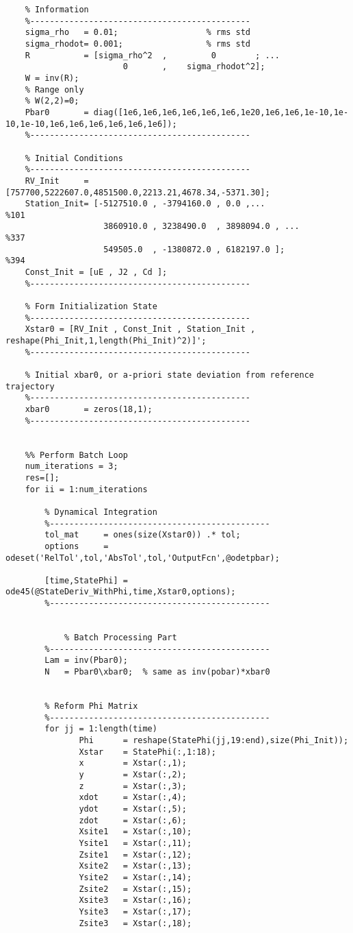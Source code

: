 \documentclass[12pt,a4paper,oneside]{article}
\numberwithin{equation}{section}   		%
\begin{document}
\begin{appendices}
\begin{lstlisting}
	% Information
	%---------------------------------------------
	sigma_rho   = 0.01;                  % rms std
	sigma_rhodot= 0.001;                 % rms std
	R           = [sigma_rho^2  ,         0        ; ...
	                    0       ,    sigma_rhodot^2];
	W = inv(R); 
	% Range only
	% W(2,2)=0;
	Pbar0       = diag([1e6,1e6,1e6,1e6,1e6,1e6,1e20,1e6,1e6,1e-10,1e-10,1e-10,1e6,1e6,1e6,1e6,1e6,1e6]);
	%---------------------------------------------
	
	% Initial Conditions
	%---------------------------------------------
	RV_Init     = [757700,5222607.0,4851500.0,2213.21,4678.34,-5371.30];
	Station_Init= [-5127510.0 , -3794160.0 , 0.0 ,...               %101
	                3860910.0 , 3238490.0  , 3898094.0 , ...        %337
	                549505.0  , -1380872.0 , 6182197.0 ];           %394
	Const_Init = [uE , J2 , Cd ];
	%---------------------------------------------
	
	% Form Initialization State
	%---------------------------------------------
	Xstar0 = [RV_Init , Const_Init , Station_Init , reshape(Phi_Init,1,length(Phi_Init)^2)]';
	%---------------------------------------------
	
	% Initial xbar0, or a-priori state deviation from reference trajectory
	%---------------------------------------------
	xbar0       = zeros(18,1);
	%---------------------------------------------
	
	
	%% Perform Batch Loop
	num_iterations = 3;
	res=[];
	for ii = 1:num_iterations
	    
	    % Dynamical Integration
	    %---------------------------------------------
	    tol_mat     = ones(size(Xstar0)) .* tol;
	    options     = odeset('RelTol',tol,'AbsTol',tol,'OutputFcn',@odetpbar);
	
	    [time,StatePhi] = ode45(@StateDeriv_WithPhi,time,Xstar0,options);
	    %---------------------------------------------
	    
	    
	        % Batch Processing Part
	    %---------------------------------------------
	    Lam = inv(Pbar0);
	    N   = Pbar0\xbar0;  % same as inv(pobar)*xbar0
	    
	
	    % Reform Phi Matrix
	    %---------------------------------------------
	    for jj = 1:length(time)
	           Phi      = reshape(StatePhi(jj,19:end),size(Phi_Init));
	           Xstar    = StatePhi(:,1:18);
	           x        = Xstar(:,1);
	           y        = Xstar(:,2);
	           z        = Xstar(:,3);
	           xdot     = Xstar(:,4);
	           ydot     = Xstar(:,5);
	           zdot     = Xstar(:,6);
	           Xsite1   = Xstar(:,10);
	           Ysite1   = Xstar(:,11);
	           Zsite1   = Xstar(:,12);
	           Xsite2   = Xstar(:,13);
	           Ysite2   = Xstar(:,14);
	           Zsite2   = Xstar(:,15);
	           Xsite3   = Xstar(:,16);
	           Ysite3   = Xstar(:,17);
	           Zsite3   = Xstar(:,18);
	

\end{lstlisting}
\end{appendices}
\end{document}
